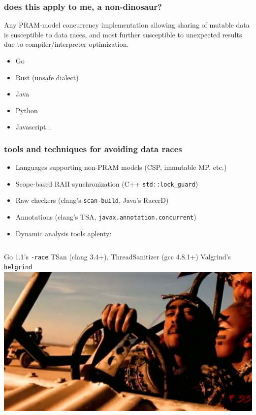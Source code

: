 \documentclass{beamer}
\begin{document}
\begin{frame}
\frametitle{does this apply to me, a non-dinosaur?}
Any PRAM-model concurrency implementation allowing sharing of mutable data
is susceptible to data races, and most further susceptible to unexpected
results due to compiler/interpreter optimization.
\vfill
\begin{itemize}
  \item Go
  \item Rust (unsafe dialect)
  \item Java
  \item Python
  \item Javascript...
\end{itemize}
\end{frame}

\begin{frame}
\frametitle{tools and techniques for avoiding data races}
\begin{itemize}
\item Languages supporting non-PRAM models (CSP, immutable MP, etc.)
\item Scope-based RAII synchronization (C++ \texttt{std::lock\_guard})
\item Raw checkers (clang's {\texttt{scan-build}}, Java's RacerD)
\item Annotations (clang's TSA, {\texttt{javax.annotation.concurrent}})
\item Dynamic analysis tools aplenty:
\end{itemize}
\vfill
\begin{columns}
Go 1.1's \texttt{-race}
\vfill
TSan (clang 3.4+), ThreadSanitizer (gcc 4.8.1+)
\vfill
Valgrind's \texttt{helgrind}
\includegraphics[width=1\textwidth]{maxresdefault.jpg}
\end{columns}
\end{frame}
\end{document}
